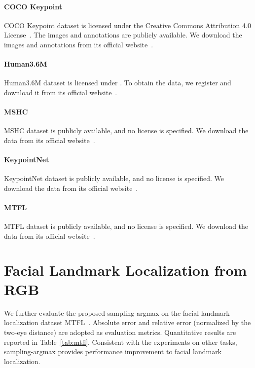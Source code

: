 \documentclass{article}
\begin{document}
\paragraph{COCO Keypoint} COCO Keypoint dataset is licensed under the Creative Commons Attribution 4.0 License~\cite{mscoco_license}. The images and annotations are publicly available. We download the images and annotations from its official website~\cite{coco_website}.

\paragraph{Human3.6M} Human3.6M dataset is licensed under \cite{h36m_license}. To obtain the data, we register and download it from its official website~\cite{h36m_website}.

\paragraph{MSHC} MSHC dataset is publicly available, and no license is specified. We download the data from its official website~\cite{mshc_website}.

\paragraph{KeypointNet} KeypointNet dataset is publicly available, and no license is specified. We download the data from its official website~\cite{keypointnet_website}.

\paragraph{MTFL} MTFL dataset is publicly available, and no license is specified. We download the data from its official website~\cite{mtfl_website}.
 
\section{Facial Landmark Localization from RGB}
\label{sec:face}

We further evaluate the proposed sampling-argmax on the facial landmark localization dataset MTFL~\cite{zhang2014facial}.
Absolute error and relative error (normalized by the two-eye distance) are adopted as evaluation metrics. Quantitative results are reported in Table~\ref{tab:mtfl}. Consistent with the experiments on other tasks, sampling-argmax provides performance improvement to facial landmark localization.
\end{document}
